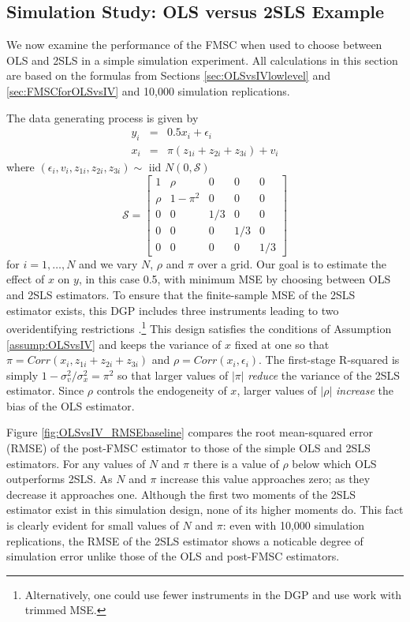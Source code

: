 \subsection{Simulation Study: OLS versus 2SLS Example}
\label{sec:OLSvsIVsim}
We now examine the performance of the FMSC when used to choose between OLS and 2SLS in a simple simulation experiment. 
All calculations in this section are based on the formulas from Sections \ref{sec:OLSvsIVlowlevel} and \ref{sec:FMSCforOLSvsIV} and 10,000 simulation replications. 

The data generating process is given by 
\begin{eqnarray}
	y_i &=& 0.5 x_i + \epsilon_i\\
	\label{eq:OLSvsIVDGP1}
	x_i &=& \pi(z_{1i} + z_{2i} + z_{3i}) + v_i
	\label{eq:OLSvsIVDGP2}
\end{eqnarray}
where $(\epsilon_i, v_i, z_{1i}, z_{2i}, z_{3i}) \sim \mbox{ iid } N(0, \mathcal{S})$
\begin{equation}
	\mathcal{S} = \left[ \begin{array}
		{ccccc} 
		1 & \rho & 0 & 0 & 0\\
		\rho & 1 - \pi^2 & 0 & 0 & 0\\
		0 & 0 & 1/3 & 0 & 0\\
		0 & 0 & 0 & 1/3 & 0 \\
		0 & 0 & 0 & 0 & 1/3
	\end{array}\right]
	\label{eq:OLSvsIVDGP3}
\end{equation}
for $i= 1, \hdots, N$ and we vary $N$, $\rho$ and $\pi$ over a grid.
Our goal is to estimate the effect of $x$ on $y$, in this case 0.5, with minimum MSE by choosing between OLS and 2SLS estimators.
To ensure that the finite-sample MSE of the 2SLS estimator exists, this DGP includes three instruments leading to two overidentifying restrictions \citep{Phillips1980}.\footnote{Alternatively, one could use fewer instruments in the DGP and use work with trimmed MSE.}
This design satisfies the conditions of Assumption \ref{assump:OLSvsIV} and keeps the variance of $x$ fixed at one so that $\pi = Corr(x_i, z_{1i} + z_{2i} + z_{3i})$ and $\rho = Corr(x_i,\epsilon_i)$.
The first-stage R-squared is simply $1 - \sigma_v^2/\sigma_x^2 = \pi^2$ so that larger values of $|\pi|$ \emph{reduce} the variance of the 2SLS estimator.
Since $\rho$ controls the endogeneity of $x$, larger values of $|\rho|$ \emph{increase} the bias of the OLS estimator.

Figure \ref{fig:OLSvsIV_RMSEbaseline} compares the root mean-squared error (RMSE) of the post-FMSC estimator to those of the simple OLS and 2SLS estimators.
For any values of $N$ and $\pi$ there is a value of $\rho$ below which OLS outperforms 2SLS. 
As $N$ and $\pi$ increase this value approaches zero; as they decrease it approaches one.
Although the first two moments of the 2SLS estimator exist in this simulation design, none of its higher moments do. 
This fact is clearly evident for small values of $N$ and $\pi$: even with 10,000 simulation replications, the RMSE of the 2SLS estimator shows a noticable degree of simulation error unlike those of the OLS and post-FMSC estimators.


